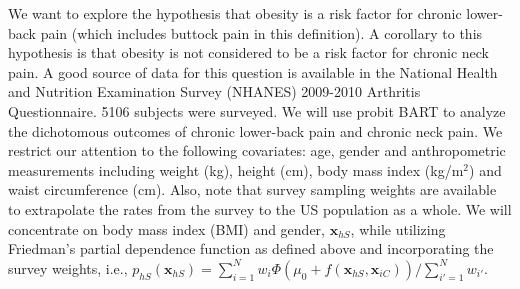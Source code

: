 \documentclass[article]{jss}
\begin{document}
We want to explore the hypothesis that obesity is a risk factor for
chronic lower-back pain (which includes buttock pain in this
definition).  A corollary to this hypothesis is that obesity is not
considered to be a risk factor for chronic neck pain.  A good source
of data for this question is available in the National Health and
Nutrition Examination Survey (NHANES) 2009-2010 Arthritis
Questionnaire.  5106 subjects were surveyed.  We will use probit BART
to analyze the dichotomous outcomes of chronic lower-back pain and
chronic neck pain.  We restrict our attention to the following
covariates: age, gender and anthropometric measurements including
weight (kg), height (cm), body mass index (kg/m$^2$) and waist
circumference (cm).  Also, note that survey sampling weights are
available to extrapolate the rates from the survey to the US
population as a whole.  We will concentrate on body mass index (BMI)
and gender, $\bm{x}_{hS}$, while utilizing Friedman's partial
dependence function as defined above and incorporating the survey
weights, i.e.,
$p_{hS}(\bm{x}_{hS}) = {\sum_{i=1}^N w_i
  \Phi(\mu_0+f(\bm{x}_{hS},\bm{x}_{iC}))}/ {\sum_{i'=1}^N w_{i'}}$.
\end{document}
